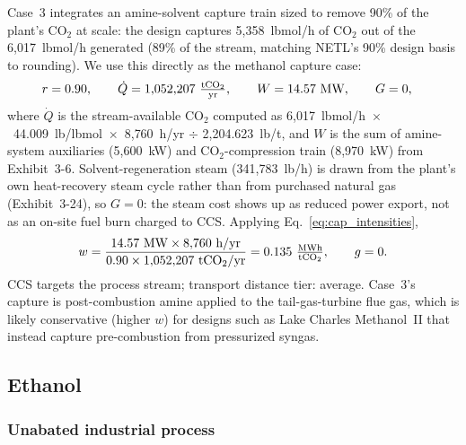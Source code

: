 \documentclass[11pt]{article}
\newcommand{\cotwo}{\ensuremath{\mathrm{CO_2}}}
\begin{document}
Case~3 integrates an amine-solvent capture train sized to remove 90\% of the plant's CO$_2$ at scale: the design captures 5{,}358~lbmol/h of CO$_2$ out of the 6{,}017~lbmol/h generated (89\% of the stream, matching NETL's 90\% design basis to rounding). We use this directly as the methanol capture case:
%
\begin{align*}
  r &= 0.90, \qquad \dot{Q} = 1{,}052{,}207~\tfrac{\text{t\cotwo{}}}{\text{yr}}, \qquad W = 14.57~\text{MW}, \qquad G = 0,
\end{align*}
%
where $\dot{Q}$ is the stream-available CO$_2$ computed as 6{,}017~lbmol/h~$\times$~44.009~lb/lbmol~$\times$~8{,}760~h/yr $\div$ 2{,}204.623~lb/t, and $W$ is the sum of amine-system auxiliaries (5{,}600~kW) and CO$_2$-compression train (8{,}970~kW) from Exhibit~3-6. Solvent-regeneration steam (341{,}783~lb/h) is drawn from the plant's own heat-recovery steam cycle rather than from purchased natural gas (Exhibit~3-24), so $G = 0$: the steam cost shows up as reduced power export, not as an on-site fuel burn charged to CCS. Applying Eq.~\eqref{eq:cap_intensities},
%
\[
  w = \frac{14.57~\text{MW} \times 8{,}760~\text{h/yr}}{0.90 \times 1{,}052{,}207~\text{t\cotwo{}/yr}} = 0.135~\tfrac{\text{MWh}}{\text{t\cotwo{}}}, \qquad g = 0.
\]
%
CCS targets the process stream; transport distance tier: average. Case~3's capture is post-combustion amine applied to the tail-gas-turbine flue gas, which is likely conservative (higher $w$) for designs such as Lake Charles Methanol~II that instead capture pre-combustion from pressurized syngas.

\subsection{Ethanol}
\label{sec:const_etoh}

\subsubsection{Unabated industrial process}
\end{document}
